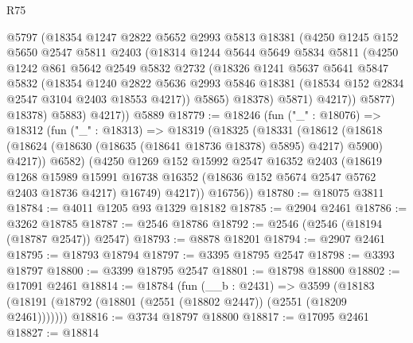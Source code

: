 \begin{lexlean}{R75}
\begin{coremodule}
              @5797
              (@18354
                @1247
                @2822
                @5652
                @2993
                @5813
                @18381
                (@4250
                  @1245
                  @152
                  @5650
                  @2547
                  @5811
                  @2403
                  (@18314
                    @1244
                    @5644
                    @5649
                    @5834
                    @5811
                    (@4250
                      @1242
                      @861
                      @5642
                      @2549
                      @5832
                      @2732
                      (@18326
                        @1241
                        @5637
                        @5641
                        @5847
                        @5832
                        (@18354
                          @1240
                          @2822
                          @5636
                          @2993
                          @5846
                          @18381
                          (@18534 @152 @2834 @2547 @3104 @2403 @18553 @4217))
                        @5865)
                      @18378)
                    @5871)
                  @4217))
              @5877)
            @18378)
          @5883)
        @4217))
    @5889
@18779 := @18246
    (fun ("_" : @18076) =>
    @18312
      (fun ("_" : @18313) =>
      @18319
        (@18325
          (@18331
            (@18612
              (@18618 (@18624 (@18630 (@18635 (@18641 @18736 @18378) @5895) @4217) @5900) @4217))
            @6582)
          (@4250
            @1269
            @152
            @15992
            @2547
            @16352
            @2403
            (@18619
              @1268
              @15989
              @15991
              @16738
              @16352
              (@18636 @152 @5674 @2547 @5762 @2403 @18736 @4217)
              @16749)
            @4217))
        @16756))
@18780 := @18075 @3811
@18784 := @4011 @1205 @93 @1329 @18182
@18785 := @2904 @2461
@18786 := @3262 @18785
@18787 := @2546 @18786
@18792 := @2546 (@2546 (@18194 (@18787 @2547)) @2547)
@18793 := @8878 @18201
@18794 := @2907 @2461
@18795 := @18793 @18794
@18797 := @3395 @18795 @2547
@18798 := @3393 @18797
@18800 := @3399 @18795 @2547
@18801 := @18798 @18800
@18802 := @17091 @2461
@18814 := @18784
    (fun (__b : @2431) =>
    @3599 (@18183 (@18191 (@18792 (@18801 (@2551 (@18802 @2447)) (@2551 (@18209 @2461)))))))
@18816 := @3734 @18797 @18800
@18817 := @17095 @2461
@18827 := @18814

\end{coremodule}
\end{lexlean}
